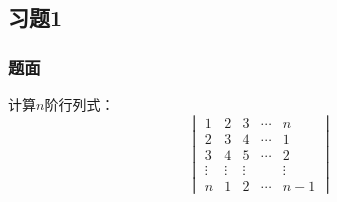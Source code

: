 \documentclass[9pt,xcolor=svgnames]{beamer} %
\begin{document}
\subsection*{习题1}
\begin{frame}
    \frametitle{题面}
    计算\(n\)阶行列式：
    \begin{equation*}
        \begin{vmatrix}
            1      & 2      & 3      & \cdots & n      \\
            2      & 3      & 4      & \cdots & 1      \\
            3      & 4      & 5      & \cdots & 2      \\
            \vdots & \vdots & \vdots &        & \vdots \\
            n      & 1      & 2      & \cdots & n-1
        \end{vmatrix}
    \end{equation*}
\end{frame}
\end{document}
